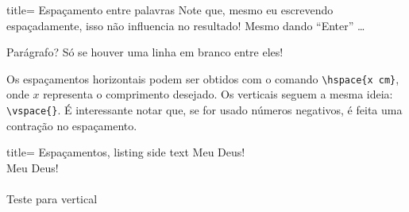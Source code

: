 \begin{tcblisting}{title= Espaçamento entre palavras}
  Note         que, mesmo        eu    escrevendo
  espaçadamente, isso não    influencia no
  resultado!
  Mesmo dando ``Enter'' \ldots
  
  Parágrafo? Só se houver uma linha em branco entre eles!
\end{tcblisting}

Os espaçamentos \textsf{horizontais} podem ser obtidos com o comando 
\Verb|\hspace{x cm}|, onde $x$ representa o comprimento desejado.
Os \textsf{verticais} seguem a mesma ideia: \Verb|\vspace{}|.
É interessante notar que, se for usado números negativos, é feita uma contração 
no espaçamento. 

\begin{tcblisting}{title= Espaçamentos, listing side text}
Meu \hspace{2cm} Deus!\\
Meu \hspace{-0.5cm} Deus!\\
\vspace*{0.7cm}\\
Teste para vertical
\end{tcblisting}  